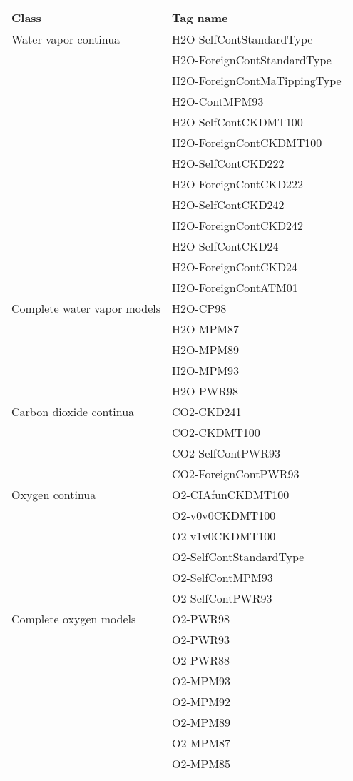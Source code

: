 \begin{table}
\centering
\footnotesize
\begin{tabular}{ll}
\hline  
Class & Tag name \\
\hline  

Water vapor continua & H2O-SelfContStandardType \\
& H2O-ForeignContStandardType \\
& H2O-ForeignContMaTippingType \\
& H2O-ContMPM93 \\
& H2O-SelfContCKDMT100 \\
& H2O-ForeignContCKDMT100 \\
& H2O-SelfContCKD222 \\
& H2O-ForeignContCKD222 \\
& H2O-SelfContCKD242 \\
& H2O-ForeignContCKD242 \\
& H2O-SelfContCKD24 \\
& H2O-ForeignContCKD24 \\
& H2O-ForeignContATM01 \\[1ex]

Complete water vapor models & H2O-CP98 \\
& H2O-MPM87 \\
& H2O-MPM89 \\
& H2O-MPM93 \\
& H2O-PWR98 \\[1ex]

Carbon dioxide continua & CO2-CKD241 \\
& CO2-CKDMT100 \\
& CO2-SelfContPWR93 \\
& CO2-ForeignContPWR93 \\[1ex]

Oxygen continua & O2-CIAfunCKDMT100 \\
& O2-v0v0CKDMT100 \\
& O2-v1v0CKDMT100 \\
& O2-SelfContStandardType \\
& O2-SelfContMPM93 \\
& O2-SelfContPWR93 \\[1ex]

Complete oxygen models & O2-PWR98 \\
& O2-PWR93 \\
& O2-PWR88 \\
& O2-MPM93 \\
& O2-MPM92 \\
& O2-MPM89 \\
& O2-MPM87 \\
& O2-MPM85 \\[1ex]


\end{tabular}
\end{table}
